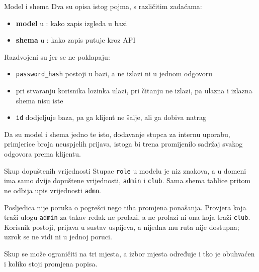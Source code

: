 \begin{frame}{Model i shema}
Dva su opisa istog pojma, s različitim zadaćama:

\begin{itemize}
  \item \textbf{model} u : kako zapis izgleda u bazi
  \item \textbf{shema} u : kako zapis putuje kroz API
\end{itemize}

\vspace{0.5em}
Razdvojeni su jer se ne poklapaju:

\begin{itemize}
  \item \texttt{password\_hash} postoji u bazi, a ne izlazi ni u jednom odgovoru
  \item pri stvaranju korisnika lozinka ulazi, pri čitanju ne izlazi, pa ulazna i izlazna shema nisu iste
  \item \texttt{id} dodjeljuje baza, pa ga klijent ne šalje, ali ga dobiva natrag
\end{itemize}

\vspace{0.4em}
Da su model i shema jedno te isto, dodavanje stupca za internu uporabu, primjerice broja neuspjelih prijava, istoga bi trena promijenilo sadržaj svakog odgovora prema klijentu.
\end{frame}

\begin{frame}{Skup dopuštenih vrijednosti}
Stupac \texttt{role} u modelu je niz znakova, a u domeni ima samo dvije dopuštene vrijednosti, \texttt{admin} i \texttt{club}. Sama shema tablice pritom ne odbija upis vrijednosti \texttt{admn}.

\vspace{0.5em}
Posljedica nije poruka o pogrešci nego tiha promjena ponašanja. Provjera koja traži ulogu \texttt{admin} za takav redak ne prolazi, a ne prolazi ni ona koja traži \texttt{club}. Korisnik postoji, prijava u sustav uspijeva, a nijedna mu ruta nije dostupna; uzrok se ne vidi ni u jednoj poruci.

\vspace{0.5em}
Skup se može ograničiti na tri mjesta, a izbor mjesta određuje i tko je obuhvaćen i koliko stoji promjena popisa.
\end{frame}

